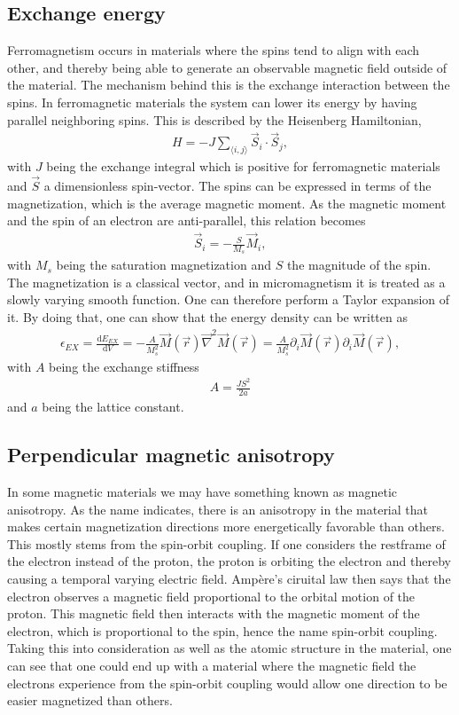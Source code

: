 \documentclass[12pt, a4paper, twoside, openright]{article}		%
\numberwithin{equation}{section}
\begin{document}
\subsection{Exchange energy}
Ferromagnetism occurs in materials where the spins tend to align with each other, and thereby being able to generate an observable magnetic field outside of the material. The mechanism behind this is the exchange interaction between the spins. In ferromagnetic materials the system can lower its energy by having parallel neighboring spins. This is described by the Heisenberg Hamiltonian,
\begin{align}
H = - J\sum_{\langle i,j\rangle} \vec{S}_i\cdot\vec{S}_j,
\end{align}
with $J$ being the exchange integral which is positive for ferromagnetic materials and $\vec{S}$ a dimensionless spin-vector. The spins can be expressed in terms of the magnetization, which is the average magnetic moment. As the magnetic moment and the spin of an electron are anti-parallel, this relation becomes
\begin{align}
\vec{S}_i = -\frac{S}{M_s}\vec{M}_i,
\end{align}
with $M_s$ being the saturation magnetization and $S$ the magnitude of the spin. The magnetization is a classical vector, and in micromagnetism it is treated as a slowly varying smooth function. One can therefore perform a Taylor expansion of it. By doing that, one can show \cite{Project} that the energy density can be written as
\begin{align}
\epsilon_{EX} = \frac{\textrm{d} E_{EX}}{\textrm{d} V} = -\frac{A}{M_s^2}\vec{M}(\vec{r})\vec{\nabla}^2\vec{M}(\vec{r}) = \frac{A}{M_s^2}\partial_i\vec{M}(\vec{r})\partial_i\vec{M}(\vec{r}), \label{eq:exchDensity}
\end{align}
with $A$ being the exchange stiffness
\begin{align}
A = \frac{J S^2}{2a}
\end{align}
and $a$ being the lattice constant.
\subsection{Perpendicular magnetic anisotropy}
In some magnetic materials we may have something known as magnetic anisotropy. As the name indicates, there is an anisotropy in the material that makes certain magnetization directions more energetically favorable than others. This mostly stems from the spin-orbit coupling. If one considers the restframe of the electron instead of the proton, the proton is orbiting the electron and thereby causing a temporal varying electric field. Amp\`{e}re's ciruital law then says that the electron observes a magnetic field proportional to the orbital motion of the proton. This magnetic field then interacts with the magnetic moment of the electron, which is proportional to the spin, hence the name spin-orbit coupling. Taking this into consideration as well as the atomic structure in the material, one can see that one could end up with a material where the magnetic field the electrons experience from the spin-orbit coupling would allow one direction to be easier magnetized than others.
\end{document}
